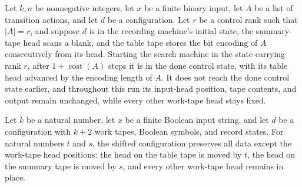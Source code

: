 \begin{lemma}
\label{Turing.StepBlock.seekTM_rank}
\leanok
{}
Let $k,n$ be nonnegative integers, let $x$ be a finite binary input, let $A$ be a list
of transition actions, and let $d$ be a configuration. Let $r$ be a control rank such
that $|A|=r$, and suppose $d$ is in the recording machine's initial state, the
summary-tape head scans a blank, and the table tape stores the bit encoding of $A$
consecutively from its head. Starting the search machine in the state carrying rank $r$,
after $1+\operatorname{cost}(A)$ steps it is in the done control state, with its table
head advanced by the encoding length of $A$. It does not reach the done control state
earlier, and throughout this run its input-head position, tape contents, and output
remain unchanged, while every other work-tape head stays fixed.
\end{lemma}

\begin{definition}
\label{Turing.StepBlock.seekShift}
\leanok
{}
Let $k$ be a natural number, let $x$ be a finite Boolean input string, and let $d$ be a
configuration with $k+2$ work tapes, Boolean symbols, and record states. For natural
numbers $t$ and $s$, the shifted configuration preserves all data except the work-tape
head positions: the head on the table tape is moved by $t$, the head on the summary tape
is moved by $s$, and every other work-tape head remains in place.
\end{definition}

